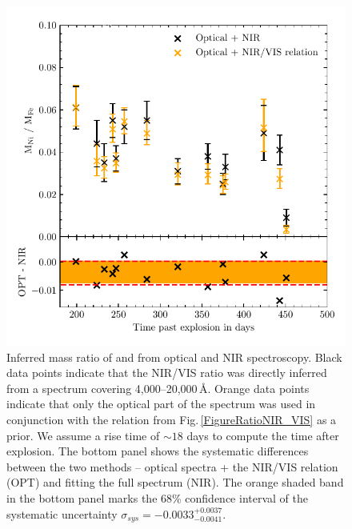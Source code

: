 \documentclass[fleqn,usenatbib]{mnras}
\begin{document}
\begin{figure}
	\includegraphics[width=\linewidth]{plots/NiFe_singly.pdf}
    \caption{Inferred mass ratio of  and  from optical and NIR spectroscopy. Black data points indicate that the  NIR/VIS ratio was directly inferred from a spectrum covering 4,000--20,000\,\AA. Orange data points indicate that only the optical part of the spectrum was used in conjunction with the relation from Fig.\,\ref{FigureRatioNIR_VIS} as a prior. We assume a rise time of $\sim 18$ days \citep{2011MNRAS.416.2607G} to compute the time after explosion. The bottom panel shows the systematic differences between the two methods -- optical spectra + the NIR/VIS relation (OPT) and fitting the full spectrum (NIR). The orange shaded band in the bottom panel marks the 68\% confidence interval of the systematic uncertainty $\sigma_{sys}=-0.0033^{+0.0037}_{-0.0041}$.}
    \label{NiOverFe}
\end{figure}
\end{document}
